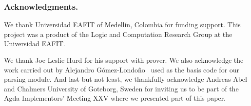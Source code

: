 \documentclass[main.tex]{subfiles}
\begin{document}

\subsubsection*{Acknowledgments.}

We thank Universidad EAFIT of Medell\'in, Colombia for funding support.
This project was a product of the Logic and Computation Research
Group at the Universidad EAFIT.

We thank Joe Leslie-Hurd for his support with \Metis prover.
We also acknowledge the work carried out by Alejandro G\'omez-Londo\~no~
\cite{Gomez-Londono2015} used as the basis code for our \TSTP parsing
module.
And last but not least, we thankfully acknowledge Andreas Abel and Chalmers
University of Goteborg, Sweden for inviting us to be part of the Agda
Implementors’ Meeting XXV where we presented part of this paper.
\end{document}
